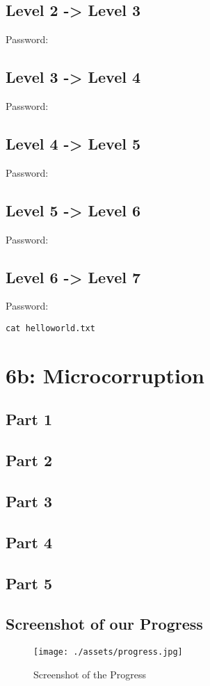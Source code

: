 \documentclass[11pt]{article}
\begin{document}
\subsection*{Level 2 -> Level 3}
Password:

\subsection*{Level 3 -> Level 4}
Password:

\subsection*{Level 4 -> Level 5}
Password:

\subsection*{Level 5 -> Level 6}
Password:

\subsection*{Level 6 -> Level 7}
Password:

\verb|cat helloworld.txt|



\section*{6b: Microcorruption}
\subsection*{Part 1}
\subsection*{Part 2}
\subsection*{Part 3}
\subsection*{Part 4}
\subsection*{Part 5}

\subsection*{Screenshot of our Progress}
\begin{figure}[!ht]
	\centering
	\texttt{[image: ./assets/progress.jpg]}
	\caption{Screenshot of the Progress}
	\label{fig:progress}
\end{figure}
\end{document}
